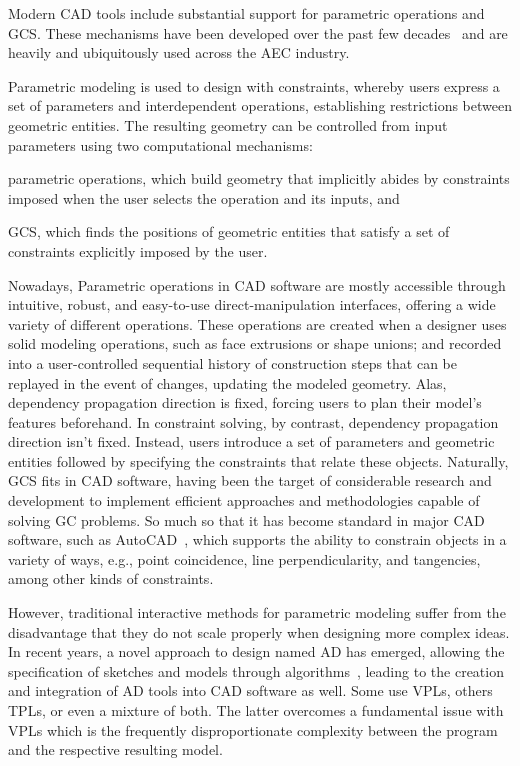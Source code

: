 %
\label{chap:intro}
\cleardoublepage{}

\noindent
Modern \ac{CAD} tools include substantial support for parametric operations and
\ac{GCS}.  These mechanisms have been developed over the past few
decades~\cite{Bettig:2011:GCSPC} and are heavily and ubiquitously used across
the \ac{AEC} industry.

Parametric modeling is used to design with constraints, whereby users express a
set of parameters and interdependent operations, establishing restrictions
between geometric entities.  The resulting geometry can be controlled from input
parameters using two computational mechanisms:
\begin{enumerate*}[label= (\arabic*)]
  \item parametric operations, which build geometry that implicitly abides by
  constraints imposed when the user selects the operation and its inputs, and
  \item \ac{GCS}, which finds the positions of geometric entities that satisfy a
  set of constraints explicitly imposed by the user.
\end{enumerate*}

Nowadays, Parametric operations in \ac{CAD} software are mostly accessible
through intuitive, robust, and easy-to-use direct-manipulation interfaces,
offering a wide variety of different operations.  These operations are created
when a designer uses solid modeling operations, such as face extrusions or shape
unions; and recorded into a user-controlled sequential history of construction
steps that can be replayed in the event of changes, updating the modeled
geometry.  Alas, dependency propagation direction is fixed, forcing users to
plan their model's features beforehand.  In constraint solving, by contrast,
dependency propagation direction isn't fixed.  Instead, users introduce a set of
parameters and geometric entities followed by specifying the constraints that
relate these objects.  Naturally, \ac{GCS} fits in \ac{CAD} software, having
been the target of considerable research and development to implement efficient
approaches and methodologies capable of solving \ac{GC} problems.  So much so
that it has become standard in major \ac{CAD} software, such as
AutoCAD~\cite{Autodesk:1982:AutoCAD}, which supports the ability to constrain
objects in a variety of ways, e.g., point coincidence, line perpendicularity,
and tangencies, among other kinds of constraints.

However, traditional interactive methods for parametric modeling suffer from the
disadvantage that they do not scale properly when designing more complex ideas.
In recent years, a novel approach to design named \ac{AD} has emerged, allowing
the specification of sketches and models through
algorithms~\cite{McCormack:2004:GDPDR}, leading to the creation and integration
of \ac{AD} tools into \ac{CAD} software as well.  Some use \acp{VPL},
others \acp{TPL}, or even a mixture of both.  The latter overcomes a fundamental
issue with \acp{VPL} which is the frequently disproportionate complexity between
the program and the respective resulting model.


